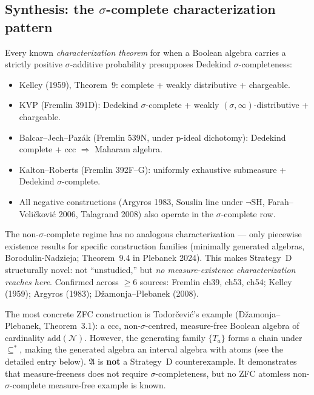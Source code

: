 \subsection*{Synthesis: the $\sigma$-complete characterization pattern}

Every known \emph{characterization theorem} for when a Boolean algebra
carries a strictly positive $\sigma$-additive probability presupposes
Dedekind $\sigma$-completeness:

\begin{itemize}[nosep]
  \item Kelley (1959), Theorem~9: complete + weakly distributive + chargeable.
  \item KVP (Fremlin 391D): Dedekind $\sigma$-complete + weakly
    $(\sigma,\infty)$-distributive + chargeable.
  \item Balcar--Jech--Paz\'{a}k (Fremlin 539N, under p-ideal dichotomy):
    Dedekind complete + ccc $\Rightarrow$ Maharam algebra.
  \item Kalton--Roberts (Fremlin 392F--G): uniformly exhaustive
    submeasure + Dedekind $\sigma$-complete.
  \item All negative constructions (Argyros 1983, Souslin line under
    $\neg$SH, Farah--Veli\v{c}kovi\'{c} 2006, Talagrand 2008) also
    operate in the $\sigma$-complete row.
\end{itemize}

\noindent
The non-$\sigma$-complete regime has no analogous characterization ---
only piecewise existence results for specific construction families
(minimally generated algebras, Borodulin-Nadzieja; Theorem~9.4 in
Plebanek 2024).  This makes Strategy~D structurally novel: not
``unstudied,'' but \emph{no measure-existence characterization reaches
here}.  Confirmed across $\geq 6$ sources: Fremlin ch39, ch53, ch54;
Kelley (1959); Argyros (1983); D\v{z}amonja--Plebanek (2008).

The most concrete ZFC construction is
Todor\v{c}evi\'{c}'s example (D\v{z}amonja--Plebanek, Theorem~3.1):
a ccc, non-$\sigma$-centred, measure-free Boolean algebra of
cardinality $\mathrm{add}(\mathcal{N})$.  However, the generating
family $\{T_a\}$ forms a chain under $\subseteq^*$, making the
generated algebra an interval algebra with atoms (see the detailed
entry below).  $\mathfrak{A}$ is \textbf{not} a Strategy~D
counterexample.  It demonstrates that measure-freeness does not
require $\sigma$-completeness, but no ZFC atomless
non-$\sigma$-complete measure-free example is known.

